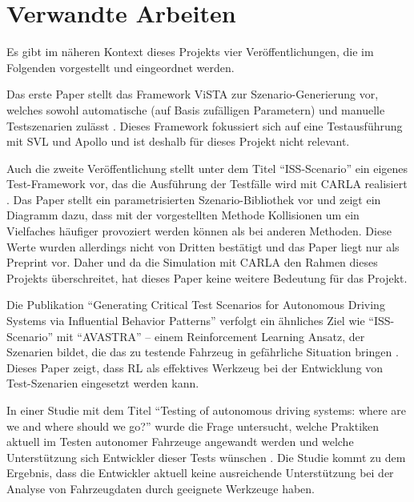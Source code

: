 \chapter{Verwandte Arbeiten}

Es gibt im näheren Kontext dieses Projekts vier Veröffentlichungen, die im Folgenden vorgestellt und eingeordnet werden.

Das erste Paper stellt das Framework ViSTA zur Szenario-Generierung vor, welches sowohl automatische (auf Basis zufälligen Parametern) und manuelle Testszenarien zulässt \cite{ViSTA}. Dieses Framework fokussiert sich auf eine Testausführung mit SVL und Apollo und ist deshalb für dieses Projekt nicht relevant.

Auch die zweite Veröffentlichung stellt unter dem Titel \enquote{ISS-Scenario} ein eigenes Test-Framework vor, das die Ausführung der Testfälle wird mit CARLA realisiert \cite{li2024issscenarioscenariobasedtestingcarla}. Das Paper stellt ein parametrisierten Szenario-Bibliothek vor und zeigt ein Diagramm dazu, dass mit der vorgestellten Methode Kollisionen um ein Vielfaches häufiger provoziert werden können als bei anderen Methoden. Diese Werte wurden allerdings nicht von Dritten bestätigt und das Paper liegt nur als Preprint vor. Daher und da die Simulation mit CARLA den Rahmen dieses Projekts überschreitet, hat dieses Paper keine weitere Bedeutung für das Projekt.

Die Publikation \enquote{Generating Critical Test Scenarios for Autonomous Driving Systems via Influential Behavior Patterns} verfolgt ein ähnliches Ziel wie \enquote{ISS-Scenario} mit \enquote{AVASTRA} -- einem Reinforcement Learning Ansatz, der Szenarien bildet, die das zu testende Fahrzeug in gefährliche Situation bringen \cite{GeneratingCritialTestScenarios}. Dieses Paper zeigt, dass RL als effektives Werkzeug bei der Entwicklung von Test-Szenarien eingesetzt werden kann.

In einer Studie mit dem Titel \enquote{Testing of autonomous driving systems: where are we and where should we go?} wurde die Frage untersucht, welche Praktiken aktuell im Testen autonomer Fahrzeuge angewandt werden und welche Unterstützung sich Entwickler dieser Tests wünschen \cite{WhereShouldWeGo}. Die Studie kommt zu dem Ergebnis, dass die Entwickler aktuell keine ausreichende Unterstützung bei der Analyse von Fahrzeugdaten durch geeignete Werkzeuge haben.
